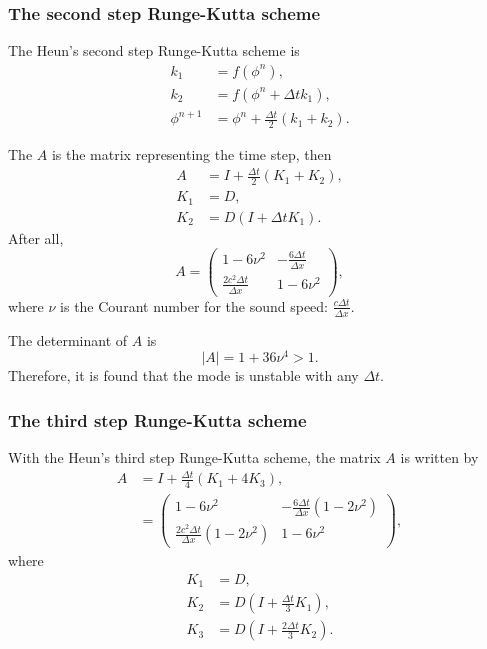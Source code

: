 \subsubsection{The second step Runge-Kutta scheme}
The Heun's second step Runge-Kutta scheme is
\begin{align}
  k_1 &= f(\phi^n), \\
  k_2 &= f(\phi^n + \Delta t k_1), \\
  \phi^{n+1} &= \phi^n + \frac{\Delta t}{2}(k_1 + k_2).
\end{align}

The $A$ is the matrix representing the time step, then
\begin{align}
  A &= I + \frac{\Delta t}{2}(K_1 + K_2), \\
  K_1 &= D, \\
  K_2 &= D (I + \Delta t K_1).
\end{align}
After all,
\begin{equation}
  A = \begin{pmatrix}
    1-6\nu^2 & -\frac{6\Delta t}{\Delta x} \\
    \frac{2c^2\Delta t}{\Delta x} & 1-6\nu^2
    \end{pmatrix},
\end{equation}
where $\nu$ is the Courant number for the sound speed: $\frac{c\Delta t}{\Delta x}$.

The determinant of $A$ is
\begin{equation}
  |A| = 1 + 36\nu^4 > 1.
\end{equation}
Therefore, it is found that the mode is unstable with any $\Delta t$.


\subsubsection{The third step Runge-Kutta scheme}
With the Heun's third step Runge-Kutta scheme, the matrix $A$ is written by
\begin{align}
  A &= I + \frac{\Delta t}{4}(K_1 + 4K_3), \\
  &= \begin{pmatrix}
    1-6\nu^2 & -\frac{6\Delta t}{\Delta x}(1-2\nu^2) \\
    \frac{2c^2\Delta t}{\Delta x}(1-2\nu^2) & 1-6\nu^2
  \end{pmatrix}, \label{eq: A two}
\end{align}
where
\begin{align}
  K_1 &= D, \\
  K_2 &= D (I + \frac{\Delta t}{3}K_1), \\
  K_3 &= D (I + \frac{2\Delta t}{3}K_2).
\end{align}

